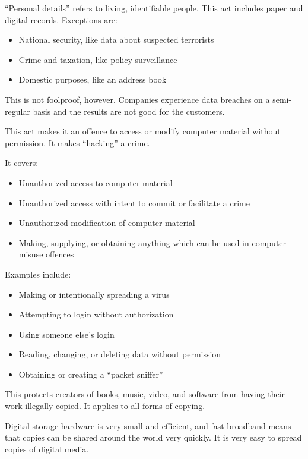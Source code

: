 \documentclass[../main.tex]{subfile}
\begin{document}
\enquote{Personal details} refers to living, identifiable people. This act includes paper and digital records. Exceptions are: \begin{itemize}
	\item National security, like data about suspected terrorists
	\item Crime and taxation, like policy surveillance
	\item Domestic purposes, like an address book
\end{itemize}

This is not foolproof, however. Companies experience data breaches on a semi-regular basis and the results are not good for the customers.


This act makes it an offence to access or modify computer material without permission. It makes \enquote{hacking} a crime.

It covers: \begin{itemize}
	\item Unauthorized access to computer material
	\item Unauthorized access with intent to commit or facilitate a crime
	\item Unauthorized modification of computer material
	\item Making, supplying, or obtaining anything which can be used in computer misuse offences
\end{itemize}

Examples include: \begin{itemize}
	\item Making or intentionally spreading a virus
	\item Attempting to login without authorization
	\item Using someone else's login
	\item Reading, changing, or deleting data without permission
	\item Obtaining or creating a \enquote{packet sniffer}
\end{itemize}


This protects creators of books, music, video, and software from having their work illegally copied. It applies to all forms of copying.

Digital storage hardware is very small and efficient, and fast broadband means that copies can be shared around the world very quickly. It is very easy to spread copies of digital media.
\end{document}
